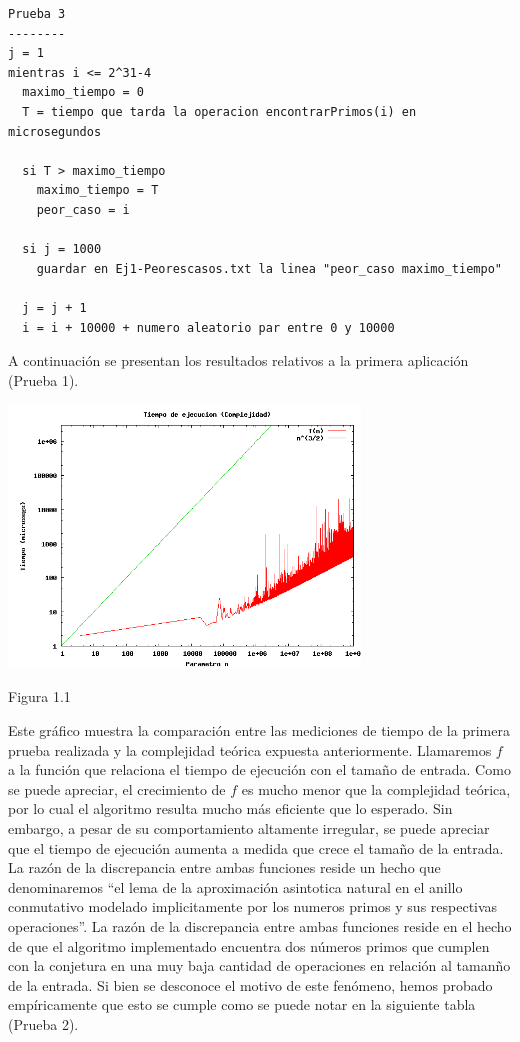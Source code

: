 \documentclass[a4paper,10pt] {article}
\begin{document}
\begin{verbatim}
Prueba 3
--------
j = 1
mientras i <= 2^31-4
  maximo_tiempo = 0
  T = tiempo que tarda la operacion encontrarPrimos(i) en microsegundos

  si T > maximo_tiempo
    maximo_tiempo = T
    peor_caso = i

  si j = 1000
    guardar en Ej1-Peorescasos.txt la linea "peor_caso maximo_tiempo"
  
  j = j + 1
  i = i + 10000 + numero aleatorio par entre 0 y 10000
\end{verbatim}

A continuaci\'on se presentan los resultados relativos a la primera aplicaci\'on (Prueba 1).

\begin{center}
 \includegraphics[width=0.7\textwidth]{Plots/Ej1-Complejidad.png}
\begin{center}
Figura 1.1
\end{center}
\end{center}

Este gr\'afico muestra la comparaci\'on entre las mediciones de tiempo de la primera prueba realizada y la complejidad te\'orica expuesta anteriormente. Llamaremos $f$ a la funci\'on que relaciona el tiempo de ejecuci\'on con el tama\~{n}o de entrada. Como se puede apreciar, el crecimiento de $f$ es mucho menor que la complejidad te\'orica, por lo cual el algoritmo resulta mucho m\'as eficiente que lo esperado. Sin embargo, a pesar de su comportamiento altamente irregular, se puede apreciar que el tiempo de ejecuci\'on aumenta a medida que crece el tama\~{n}o de la entrada. La raz\'on de la discrepancia entre ambas funciones reside un hecho que denominaremos ``el lema de la aproximaci\'on asintotica natural en el anillo conmutativo modelado implicitamente por los numeros primos y sus respectivas operaciones''. La raz\'on de la discrepancia entre ambas funciones reside en el hecho de que el algoritmo implementado encuentra dos n\'umeros primos que cumplen con la conjetura en una muy baja cantidad de operaciones en relaci\'on al taman\~{n}o de la entrada. Si bien se desconoce el motivo de este fen\'omeno, hemos probado emp\'iricamente que esto se cumple como se puede notar en la siguiente tabla (Prueba 2).
\end{document}

